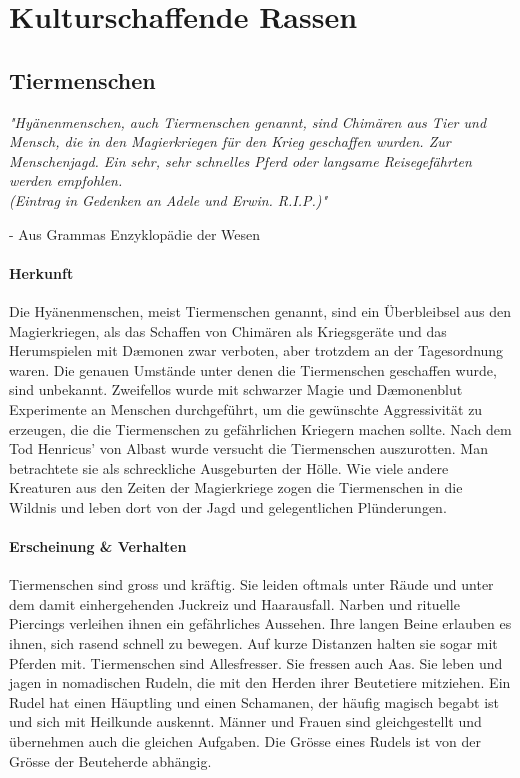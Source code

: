 \documentclass[10pt,twoside,twocolumn,openany]{book}
\begin{document}
\section{Kulturschaffende Rassen}
\subsection{Tiermenschen}
\begin{quotebox}
	\textit{"Hyänenmenschen, auch Tiermenschen genannt, sind Chimären aus Tier und Mensch, die in den Magierkriegen für den Krieg geschaffen wurden. Zur Menschenjagd. Ein sehr, sehr schnelles Pferd oder langsame Reisegefährten werden empfohlen. \\ (Eintrag in Gedenken an Adele und Erwin. R.I.P.)"}
	\begin{flushright}
		- Aus Grammas Enzyklopädie der Wesen
	\end{flushright}
\end{quotebox}

\paragraph{Herkunft}
Die Hyänenmenschen, meist Tiermenschen genannt, sind ein Überbleibsel aus den Magierkriegen, als das Schaffen von Chimären als Kriegsgeräte und das Herumspielen mit D\ae monen zwar verboten, aber trotzdem an der Tagesordnung waren.
Die genauen Umstände unter denen die Tiermenschen geschaffen wurde, sind unbekannt. Zweifellos wurde mit schwarzer Magie und D\ae monenblut Experimente an  Menschen durchgeführt, um die gewünschte Aggressivität zu erzeugen, die die Tiermenschen zu gefährlichen Kriegern machen sollte.
Nach dem Tod Henricus' von Albast wurde versucht die Tiermenschen auszurotten. Man betrachtete sie als schreckliche Ausgeburten der Hölle. Wie  viele andere Kreaturen aus den Zeiten der Magierkriege zogen die Tiermenschen in die Wildnis und leben dort von der Jagd und gelegentlichen Plünderungen.

\paragraph{Erscheinung \& Verhalten}
Tiermenschen sind gross und kräftig. Sie leiden oftmals unter Räude und unter dem damit einhergehenden Juckreiz und Haarausfall. Narben und rituelle Piercings verleihen ihnen ein gefährliches Aussehen. Ihre langen Beine erlauben es ihnen, sich rasend schnell zu bewegen. Auf kurze Distanzen  halten sie sogar mit Pferden mit.
Tiermenschen sind Allesfresser. Sie fressen auch Aas. Sie leben und jagen in nomadischen Rudeln, die mit den Herden ihrer Beutetiere mitziehen.
Ein Rudel hat einen Häuptling und einen Schamanen, der häufig magisch begabt ist und sich mit Heilkunde auskennt. Männer und Frauen sind gleichgestellt und übernehmen auch die gleichen Aufgaben. Die Grösse eines Rudels ist von der Grösse der Beuteherde abhängig.
\end{document}
